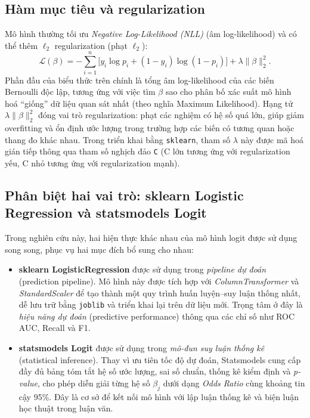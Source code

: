 \subsection{Hàm mục tiêu và regularization}
Mô hình thường tối ưu \textit{Negative Log-Likelihood (NLL)} (âm log-likelihood) và có thể thêm \(\ell_2\) regularization (phạt \(\ell_2\)):
\[
\mathcal{L}(\beta) = -\sum_{i=1}^{n}\Big[y_i\log p_i + (1-y_i)\log(1-p_i)\Big] + \lambda \|\beta\|_2^2.
\]
\noindent
Phần đầu của biểu thức trên chính là tổng âm log-likelihood của các biến Bernoulli độc lập, tương ứng với việc tìm \(\beta\) sao cho phân bố xác suất mô hình hoá ``giống'' dữ liệu quan sát nhất (theo nghĩa Maximum Likelihood). Hạng tử \(\lambda \|\beta\|_2^2\) đóng vai trò regularization: phạt các nghiệm có hệ số quá lớn, giúp giảm overfitting và ổn định ước lượng trong trường hợp các biến có tương quan hoặc thang đo khác nhau. Trong triển khai bằng \texttt{sklearn}, tham số \(\lambda\) này được mã hoá gián tiếp thông qua tham số nghịch đảo \texttt{C} (C lớn tương ứng với regularization yếu, C nhỏ tương ứng với regularization mạnh).

\subsection{Phân biệt hai vai trò: sklearn Logistic Regression và statsmodels Logit}

Trong nghiên cứu này, hai hiện thực khác nhau của mô hình logit được sử dụng song song, phục vụ hai mục đích bổ sung cho nhau:

\begin{itemize}
  \item \textbf{sklearn LogisticRegression} được sử dụng trong \textit{pipeline dự đoán} (prediction pipeline). 
  Mô hình này được tích hợp với \textit{ColumnTransformer} và \textit{StandardScaler} để tạo thành một quy trình huấn luyện--suy luận thống nhất, dễ lưu trữ bằng \texttt{joblib} và triển khai lại trên dữ liệu mới. 
  Trọng tâm ở đây là \textit{hiệu năng dự đoán} (predictive performance) thông qua các chỉ số như ROC AUC, Recall và F1.
  \item \textbf{statsmodels Logit} được sử dụng trong \textit{mô-đun suy luận thống kê} (statistical inference). 
  Thay vì ưu tiên tốc độ dự đoán, Statsmodels cung cấp đầy đủ bảng tóm tắt hệ số ước lượng, sai số chuẩn, thống kê kiểm định và \textit{p-value}, cho phép diễn giải từng hệ số \(\beta_j\) dưới dạng \textit{Odds Ratio} cùng khoảng tin cậy 95\%. 
  Đây là cơ sở để kết nối mô hình với lập luận thống kê và biện luận học thuật trong luận văn.
\end{itemize}

